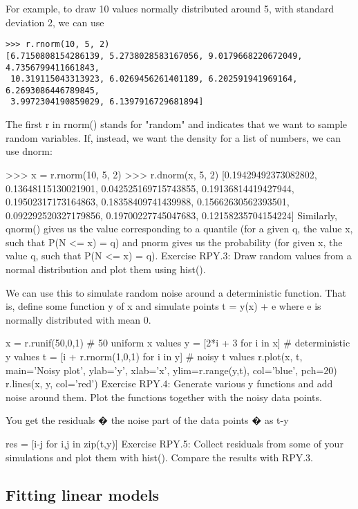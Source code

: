 For example, to draw 10 values normally distributed around 5, with standard deviation 2, we can use
\begin{verbatim}
>>> r.rnorm(10, 5, 2)
[6.7150808154286139, 5.2738028583167056, 9.0179668220672049, 4.7356799411661843,
 10.319115043313923, 6.0269456261401189, 6.202591941969164, 6.2693086446789845,
 3.9972304190859029, 6.1397916729681894]
\end{verbatim}
The first r in rnorm() stands for "random" and indicates that we want to sample random variables. If, instead, we want the density for a list of numbers, we can use dnorm:

>>> x = r.rnorm(10, 5, 2)
>>> r.dnorm(x, 5, 2)
[0.19429492373082802, 0.13648115130021901, 0.042525169715743855,
0.19136814419427944, 0.19502317173164863, 0.18358409741439988,
0.15662630562393501, 0.092292520327179856, 0.19700227745047683,
0.12158235704154224]
Similarly, qnorm() gives us the value corresponding to a quantile (for a given q, the value x, such that P(N <= x) = q) and pnorm gives us the probability (for given x, the value q, such that P(N <= x) = q).
\newpage
Exercise RPY.3: Draw random values from a normal distribution and plot them using hist().

We can use this to simulate random noise around a deterministic function. That is, define some function y of x and simulate points t = y(x) + e where e is normally distributed with mean 0.

x = r.runif(50,0,1)                              # 50 uniform x values
y = [2*i + 3 for i in x]                         # deterministic y values
t = [i + r.rnorm(1,0,1) for i in y]              # noisy t values
r.plot(x, t, main='Noisy plot', ylab='y', xlab='x', ylim=r.range(y,t),
       col='blue', pch=20)
r.lines(x, y, col='red')
Exercise RPY.4: Generate various y functions and add noise around them. Plot the functions together with the noisy data points.

You get the residuals � the noise part of the data points � as t-y

res = [i-j for i,j in zip(t,y)]
Exercise RPY.5: Collect residuals from some of your simulations and plot them with hist(). Compare the results with RPY.3.

\subsection{Fitting linear models}

